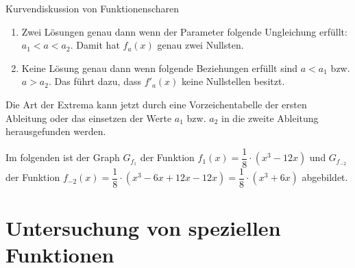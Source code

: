 \begin{bsp}{Kurvendiskussion von Funktionenscharen}{}
\begin{itemize}
\begin{enumerate}
\item Zwei Lösungen genau dann wenn der Parameter folgende Ungleichung erfüllt: $a_1<a<a_2$. Damit hat $f_a(x)$ genau zwei Nullsten.
\item Keine Lösung genau dann wenn folgende Beziehungen erfüllt sind $a<a_1$ bzw. $a>a_2$. Das führt dazu, dass $f'_a(x)$ keine Nullstellen besitzt.
    \end{enumerate}
Die Art der Extrema kann jetzt durch eine Vorzeichentabelle der ersten Ableitung oder das einsetzen der Werte $a_1$ bzw. $a_2$ in die zweite Ableitung herausgefunden werden. 
\end{itemize}
Im folgenden ist der Graph $G_{f_1}$ der Funktion $f_1(x) = \dfrac{1}{8}\cdot(x^3-12x)$ und $G_{f_{-2}}$  der Funktion $f_{-2}(x)= \dfrac{1}{8} \cdot(x^3 -6x+12x-12x) = \dfrac{1}{8}\cdot(x^3+6x)$ abgebildet.
\begin{center}
\end{center}
\end{bsp}
\section{Untersuchung von speziellen Funktionen}
